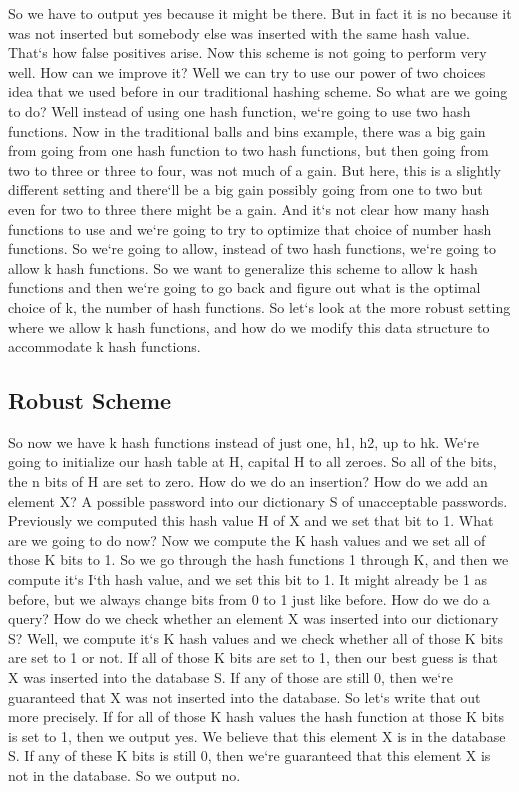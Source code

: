 So we have to output yes because it might be there.
But in fact it is no because it was not inserted but somebody else was inserted with the same hash value.
That`s how false positives arise.
Now this scheme is not going to perform very well.
How can we improve it? Well we can try to use our power of two choices idea that we used before in our traditional hashing scheme.
So what are we going to do? Well instead of using one hash function, we`re going to use two hash functions.
Now in the traditional balls and bins example, there was a big gain from going from one hash function to two hash functions, but then going from two to three or three to four, was not much of a gain.
But here, this is a slightly different setting and there`ll be a big gain possibly going from one to two but even for two to three there might be a gain.
And it`s not clear how many hash functions to use and we`re going to try to optimize that choice of number hash functions.
So we`re going to allow, instead of two hash functions, we`re going to allow k hash functions.
So we want to generalize this scheme to allow k hash functions and then we`re going to go back and figure out what is the optimal choice of k, the number of hash functions.
So let`s look at the more robust setting where we allow k hash functions, and how do we modify this data structure to accommodate k hash functions.

\subsection{Robust Scheme}
So now we have k hash functions instead of just one, h1, h2, up to hk.
We`re going to initialize our hash table at H, capital H to all zeroes.
So all of the bits, the n bits of H are set to zero.
How do we do an insertion? How do we add an element X? A possible password into our dictionary S of unacceptable passwords.
Previously we computed this hash value H of X and we set that bit to 1.
What are we going to do now? Now we compute the K hash values and we set all of those K bits to 1.
So we go through the hash functions 1 through K, and then we compute it`s I`th hash value, and we set this bit to 1.
It might already be 1 as before, but we always change bits from 0 to 1 just like before.
How do we do a query? How do we check whether an element X was inserted into our dictionary S? Well, we compute it`s K hash values and we check whether all of those K bits are set to 1 or not.
If all of those K bits are set to 1, then our best guess is that X was inserted into the database S\@.
If any of those are still 0, then we`re guaranteed that X was not inserted into the database.
So let`s write that out more precisely.
If for all of those K hash values the hash function at those K bits is set to 1, then we output yes.
We believe that this element X is in the database S\@.
If any of these K bits is still 0, then we`re guaranteed that this element X is not in the database.
So we output no.

